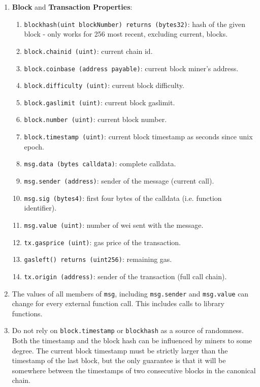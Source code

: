 \begin{enumerate}
\item\textbf{Block} and \textbf{Transaction Properties}:
    \begin{enumerate}
    \item\verb|blockhash(uint blockNumber) returns (bytes32)|: hash of the given block - only works for 256 most recent, excluding current, blocks.
    \item\verb|block.chainid (uint)|: current chain id.
    \item\verb|block.coinbase (address payable)|: current block miner’s address.
    \item\verb|block.difficulty (uint)|: current block difficulty.
    \item\verb|block.gaslimit (uint)|: current block gaslimit.
    \item\verb|block.number (uint)|: current block number.
    \item\verb|block.timestamp (uint)|: current block timestamp as seconds since unix epoch.
    \item\verb|msg.data (bytes calldata)|: complete calldata.
    \item\verb|msg.sender (address)|: sender of the message (current call).
    \item\verb|msg.sig (bytes4)|: first four bytes of the calldata (i.e. function identifier).
    \item\verb|msg.value (uint)|: number of wei sent with the message.
    \item\verb|tx.gasprice (uint)|: gas price of the transaction.
    \item\verb|gasleft() returns (uint256)|: remaining gas.
    \item\verb|tx.origin (address)|: sender of the transaction (full call chain).
    \end{enumerate}

\item The values of all members of \verb|msg|, including \verb|msg.sender| and \verb|msg.value| can change for every external function call. This includes calls to library functions.

\item Do not rely on \verb|block.timestamp| or \verb|blockhash| as a source of randomness. Both the timestamp and the block hash can be influenced by miners to some degree. The current block timestamp must be strictly larger than the timestamp of the last block, but the only guarantee is that it will be somewhere between the timestamps of two consecutive blocks in the canonical chain.


\end{enumerate}
